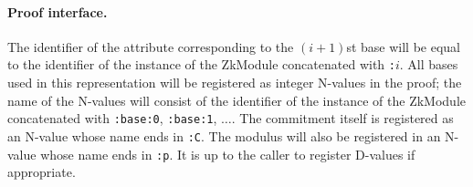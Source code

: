     \paragraph{Proof interface.}
    The identifier of the attribute corresponding to the $(i+1)$st base will
    be equal to the identifier of the instance of the ZkModule concatenated
    with \texttt{:$i$}.
    All bases used in this representation will be registered as integer N-values in
    the proof; the name of the N-values will consist of the identifier of the instance
    of the ZkModule concatenated with \texttt{:base:0}, \texttt{:base:1}, $\ldots$.
    The commitment itself is registered as
    an N-value whose name ends in \texttt{:C}. The modulus will also be registered in
    an N-value whose name ends in \texttt{:p}. It is up to the caller to register D-values
    if appropriate.

